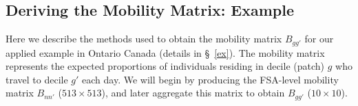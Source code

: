\clearpage
\subsection{Deriving the Mobility Matrix: Example}\label{app.mob}
Here we describe the methods used to obtain the mobility matrix $B_{gg'}$
for our applied example in Ontario Canada (details in \S~\ref{ex}).
The mobility matrix  represents
the expected proportions of individuals residing in decile (patch) $g$ who travel to decile $g'$ each day.
We will begin by producing the FSA-level mobility matrix $B_{nn'}$ ($513 \times 513$),
and later aggregate this matrix to obtain $B_{gg'}$ ($10 \times 10$).
